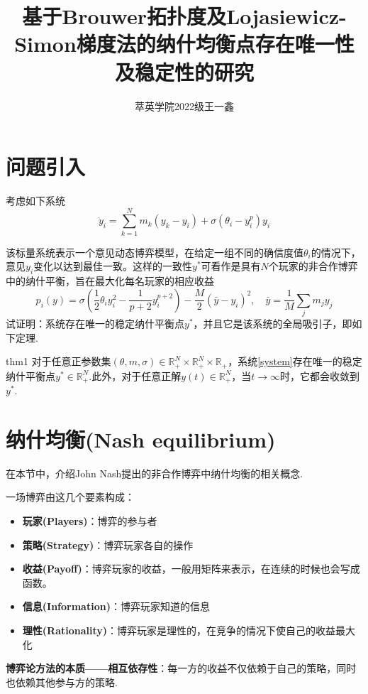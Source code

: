 \documentclass[11pt,a4paper]{article}
\title{基于Brouwer拓扑度及Lojasiewicz-Simon梯度法的纳什均衡点存在唯一性及稳定性的研究}
\author{萃英学院\qquad 2022级\qquad 王一鑫}
\theoremstyle{definition}
\begin{document}
	\maketitle
	\section{问题引入}
	考虑如下系统
	\begin{equation}\label{system}
		\dot{y}_{i}=\sum_{k=1}^{N}m_{k}(y_{k}-y_{i})+\sigma(\theta_{i}-y_{i}^{p})y_{i}
	\end{equation}
	
	该标量系统表示一个意见动态博弈模型，在给定一组不同的确信度值$\theta_{i}$的情况下，意见$y_{i}$变化以达到最佳一致。这样的一致性$y^{*}$可看作是具有$N$个玩家的非合作博弈中的纳什平衡，旨在最大化每名玩家的相应收益
	\[ p_{i}(y)=\sigma(\dfrac{1}{2}\theta_{i}y_{i}^{2}-\dfrac{1}{p+2}y_{i}^{p+2})-\dfrac{M}{2}(\bar{y}-y_{i})^{2},\quad \bar{y}=\dfrac{1}{M}\sum_{j}m_{j}y_{j} \]
	试证明：系统存在唯一的稳定纳什平衡点$y^{*}$，并且它是该系统的全局吸引子，即如下定理.\\
	\begin{thm}{}{thm1}
		对于任意正参数集$(\theta,m,\sigma)\in\mathbb{R}_{+}^{N}\times\mathbb{R}_{+}^{N}\times\mathbb{R}_{+}$，系统\eqref{system}存在唯一的稳定纳什平衡点$y^{*}\in\mathbb{R}_{+}^{N}$.此外，对于任意正解$y(t)\in\mathbb{R}_{+}^{N}$，当$t\to\infty$时，它都会收敛到$y^{*}$.
	\end{thm}
	\section{纳什均衡(Nash equilibrium)} 
	在本节中，介绍John Nash提出的非合作博弈中纳什均衡\cite{ref2}的相关概念.
	
	一场博弈由这几个要素构成：
	\begin{itemize}
		\item \textbf{玩家(Players)}：博弈的参与者
		\item \textbf{策略(Strategy)}：博弈玩家各自的操作
		\item \textbf{收益(Payoff)}：博弈玩家的收益，一般用矩阵来表示，在连续的时候也会写成函数。
		\item \textbf{信息(Information)}：博弈玩家知道的信息
		\item \textbf{理性(Rationality)}：博弈玩家是理性的，在竞争的情况下使自己的收益最大化
	\end{itemize}
	
	\textbf{博弈论方法的本质——相互依存性}：每一方的收益不仅依赖于自己的策略，同时也依赖其他参与方的策略.
	
\end{document}
